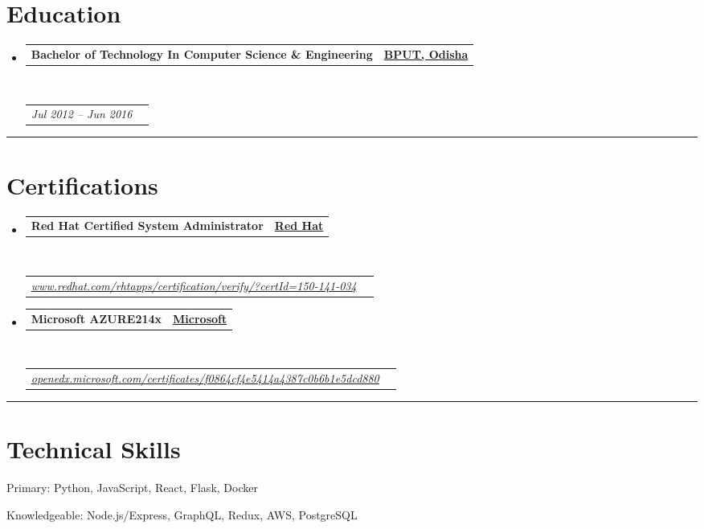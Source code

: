\documentclass[10pt,a4paper,hidelinks]{article}
\makeatletter
\newenvironment{indentsection}[1]%
{\begin{list}{}%
	{\setlength{\leftmargin}{#1}}%
	\item[]%
}
{\end{list}}
\newcommand{\headerrow}[2]
{\begin{tabular*}{\linewidth}{l@{\extracolsep{\fill}}r}
	#1 &
	#2 \\
\end{tabular*}}
\makeatother
\begin{document}
\section*{Education}

\begin{itemize}
	\parskip=0.1em

	\item 
	\headerrow
		{\textbf{Bachelor of Technology In Computer Science \& Engineering}}
		{{\href{http://www.bput.ac.in/}{\textbf{BPUT, Odisha}}}}
	\\
	\headerrow
		{\emph{Jul 2012 -- Jun 2016}}
		{\emph{}}

\end{itemize}


\hrule
\vspace{-0.3em}
\section*{Certifications}

\begin{itemize}
	\parskip=0.1em

	\item 
	\headerrow
		{\textbf{Red Hat Certified System Administrator}}
		{{\href{https://www.redhat.com/}{\textbf{Red Hat}}}}
	\\
	\headerrow
	    {\emph{\href{https://www.redhat.com/rhtapps/certification/verify/?certId=150-141-034}{www.redhat.com/rhtapps/certification/verify/?certId=150-141-034}}}
		{\emph{}}
	
	\item 
	\headerrow
		{\textbf{Microsoft AZURE214x}}
		{{\href{https://www.microsoft.com/}{\textbf{Microsoft}}}}
	\\
	\headerrow
	    {\emph{\href{https://openedx.microsoft.com/certificates/f0864cf4e5414a4387c0b6b1e5dcd880}{openedx.microsoft.com/certificates/f0864cf4e5414a4387c0b6b1e5dcd880}}}
		{\emph{}}

\end{itemize}


\hrule
\vspace{-0.3em}
\section*{Technical Skills}

\begin{indentsection}{\parindent}
\begin{description*}
 	\item[Primary:]
  	Python, JavaScript, React, Flask, Docker
  	\item[Knowledgeable:]
  	Node.js/Express, GraphQL, Redux, AWS, PostgreSQL
\end{description*}
\end{indentsection}
\end{document}
